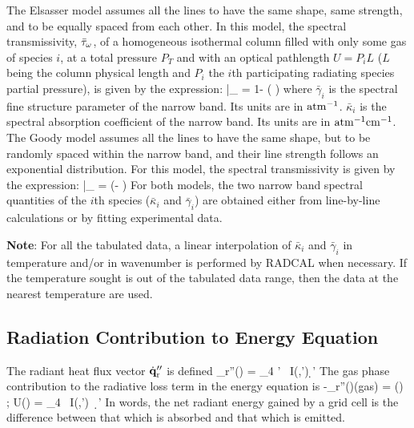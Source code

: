 The Elsasser model assumes all the lines to have the same shape, same strength,
and to be equally spaced from each other. In this model, the spectral
transmissivity, $\bar{\tau}_{\omega}$, of a homogeneous isothermal column filled
with only some gas of species $i$,
at a total pressure $P_T$ and with an optical pathlength $U = P_i L$ ($L$
being the column physical length and $P_i$ the $i$th participating radiating
species partial pressure), is given by the expression:
\be\label{eq::Elsasser}
    \bar{\tau}_{\om} = 1- \erf \left(   \right)
\ee
where $\bar{\gamma}_i$ is the spectral fine structure parameter of the narrow
band. Its units are in $\rm atm^{-1}$. $\bar{\kappa}_i$ is the spectral absorption coefficient of the narrow
band. Its units are in $\rm atm^{-1}cm^{-1}$. The Goody model assumes all the lines to have the same shape, but to be randomly
spaced within the narrow band, and their line strength follows an exponential
distribution. For this model, the spectral transmissivity is given by the expression:
\be\label{eq::Goody}
    \bar{\tau}_{\om} = \exp\left(- {\displaystyle {}}\right)
\ee
For both models, the two narrow band spectral quantities of the $i$th species ($\bar{\kappa}_i$ and
$\bar{\gamma}_i$) are obtained either from line-by-line calculations or by fitting
experimental data.

\textbf{Note}: For all the tabulated data, a linear interpolation of
$\bar{\kappa}_i$ and $\bar{\gamma}_i$ in temperature and/or in wavenumber is
performed by RADCAL when necessary. If the temperature sought is out of the
tabulated data range, then the data at the nearest temperature are used.


\subsection{Radiation Contribution to Energy Equation}

The radiant heat flux vector $\dot{\mathbf{q}}_{\rm r}''$ is defined
\be \dbq_{\rm r}''(\bx) = \int_{4\pi} \; \bs' \, I(\bx,\bs') \; \d \bs'   \ee
The gas phase contribution to the radiative loss term in the energy equation is
\be -\nabla\!\cdot \dbq_{\rm r}''(\bx)(\mbox{gas}) =
    \kappa(\bx) \, \left[ U(\bx) - 4 \pi \, I_{\rm b}(\bx) \right]  \quad ; \quad
    U(\bx) = \int_{4\pi} \, I(\bx,\bs') \, \d \bs'  \label{net_emission}
\ee
In words, the net radiant energy gained by a grid cell is the
difference between that which is absorbed and that which is emitted.

